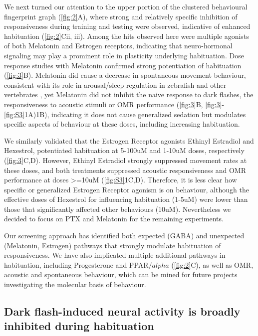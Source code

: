 \documentclass[9pt,lineno]{RandlettLab_elife}
\begin{document}
We next turned our attention to the upper portion of the clustered behavioural fingerprint graph (\autoref{fig:2}A), where strong and relatively specific inhibition of responsiveness during training and testing were observed, indicative of enhanced habituation (\autoref{fig:2}Cii, iii). Among the hits observed here were multiple agonists of both Melatonin and Estrogen receptors, indicating that neuro-hormonal signaling may play a prominent role in plasticity underlying habituation. Dose response studies with Melatonin confirmed strong potentiation of habituation (\autoref{fig:3}B). Melatonin did cause a decrease in spontaneous movement behaviour, consistent with its role in arousal/sleep regulation in zebrafish and other vertebrates \cite{Gandhi2015-vw, Zhdanova2001-dq}, yet Melatonin did not inhibit the naive response to dark flashes, the responsiveness to acoustic stimuli or OMR performance (\autoref{fig:3}B, \autoref{fig:3}-\autoref{fig:S3}1A)1B), indicating it does not cause generalized sedation but modulates specific aspects of behaviour at these doses, including increasing habituation. 

We similarly validated that the Estrogen Receptor agonists Ethinyl Estradiol and Hexestrol, potentiated habituation at 5-100uM and 1-10uM doses, respectively (\autoref{fig:3}C,D). However, Ethinyl Estradiol strongly suppressed movement rates at these doses, and both treatments suppressed acoustic responsiveness and OMR performance at doses >=10uM (\autoref{fig:S3}1C,D). Therefore, it is less clear how specific or generalized Estrogen Receptor agonism is on behaviour, although the effective doses of Hexestrol for influencing habituation (1-5uM) were lower than those that significantly affected other behaviours (10uM). Nevertheless we decided to focus on PTX and Melatonin for the remaining experiments. 


Our screening approach has identified both expected (GABA) and unexpected (Melatonin, Estrogen) pathways that strongly modulate habituation of responsiveness. We have also implicated multiple additional pathways in habituation, including Progesterone and PPAR$/alpha$ (\autoref{fig:2}C), as well as OMR, acoustic and spontaneous behaviour, which can be mined for future projects investigating the molecular basis of behaviour. 

\subsection{Dark flash-induced neural activity is broadly inhibited during habituation}
\end{document}
